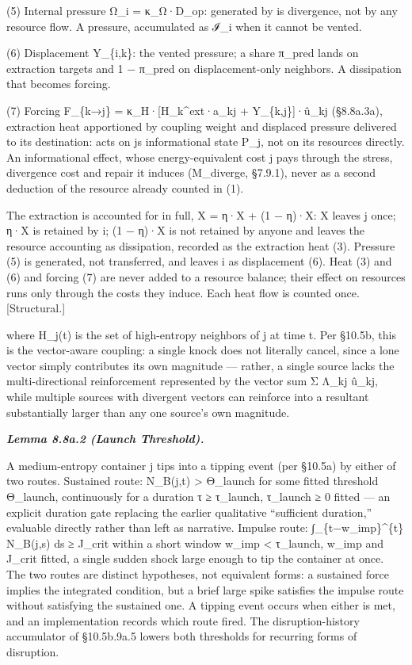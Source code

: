 \documentclass[
]{article}
\begin{document}
(5) Internal pressure Ω\_i = κ\_Ω·D\_op: generated by
i\textquotesingle s divergence, not by any resource flow. A pressure,
accumulated as ℐ\_i when it cannot be vented.

(6) Displacement Y\_\{i,k\}: the vented pressure; a share π\_pred lands
on extraction targets and 1 − π\_pred on displacement-only neighbors. A
dissipation that becomes forcing.

(7) Forcing F\_\{k→j\} = κ\_H·{[}H\_k\^{}ext·a\_kj + Y\_\{k,j\}{]}·û\_kj
(§8.8a.3a), extraction heat apportioned by coupling weight and displaced
pressure delivered to its destination: acts on j\textquotesingle s
informational state P\_j, not on its resources directly. An
informational effect, whose energy-equivalent cost j pays through the
stress, divergence cost and repair it induces (M\_diverge, §7.9.1),
never as a second deduction of the resource already counted in (1).

The extraction is accounted for in full, X = η·X + (1 − η)·X: X leaves j
once; η·X is retained by i; (1 − η)·X is not retained by anyone and
leaves the resource accounting as dissipation, recorded as the
extraction heat (3). Pressure (5) is generated, not transferred, and
leaves i as displacement (6). Heat (3) and (6) and forcing (7) are never
added to a resource balance; their effect on resources runs only through
the costs they induce. Each heat flow is counted once. {[}Structural.{]}

where H\_j(t) is the set of high-entropy neighbors of j at time t. Per
§10.5b, this is the vector-aware coupling: a single knock does not
literally cancel, since a lone vector simply contributes its own
magnitude --- rather, a single source lacks the multi-directional
reinforcement represented by the vector sum Σ Λ\_kj û\_kj, while
multiple sources with divergent vectors can reinforce into a resultant
substantially larger than any one source's own magnitude.

\emph{\textbf{Lemma 8.8a.2 (Launch Threshold).}}

A medium-entropy container j tips into a tipping event (per §10.5a) by
either of two routes. Sustained route: N\_B(j,t) \textgreater{}
Θ\_launch for some fitted threshold Θ\_launch, continuously for a
duration τ ≥ τ\_launch, τ\_launch ≥ 0 fitted --- an explicit duration
gate replacing the earlier qualitative ``sufficient duration,''
evaluable directly rather than left as narrative. Impulse route:
∫\_\{t−w\_imp\}\^{}\{t\} N\_B(j,s) ds ≥ J\_crit within a short window
w\_imp \textless{} τ\_launch, w\_imp and J\_crit fitted, a single sudden
shock large enough to tip the container at once. The two routes are
distinct hypotheses, not equivalent forms: a sustained force implies the
integrated condition, but a brief large spike satisfies the impulse
route without satisfying the sustained one. A tipping event occurs when
either is met, and an implementation records which route fired. The
disruption-history accumulator of §10.5b.9a.5 lowers both thresholds for
recurring forms of disruption.
\end{document}
